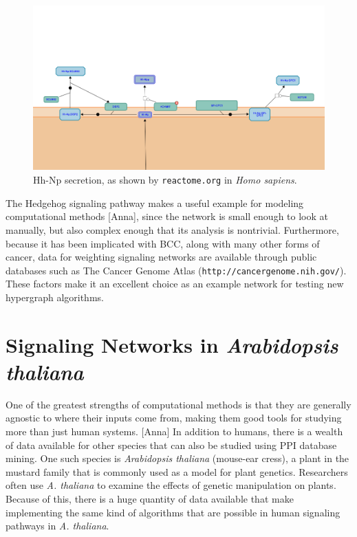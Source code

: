 \documentclass[12pt,twoside]{reedthesis}
\newcommand{\new}[2]{{\color{orange}#1 [#2]}}
\theoremstyle{definition}
\begin{document}
\begin{figure}[h]
  \begin{center}
    \includegraphics[width=\textwidth]{Hh-Np_secretion}
  \caption[Hedgehog secretion in \textit{Homo sapiens}]{Hh-Np secretion, as shown by \texttt{reactome.org} in \textit{Homo sapiens}.}
  \label{fig:Hh-Np_secretion}
  \end{center}
\end{figure}

The Hedgehog signaling pathway makes a useful example for modeling \new{computational methods}{Anna}, since the network is small enough to look at manually, but also complex enough that its analysis is nontrivial. Furthermore, because it has been implicated with BCC, along with many other forms of cancer, data for weighting signaling networks are available through public databases such as The Cancer Genome Atlas (\texttt{http://cancergenome.nih.gov/}). These factors make it an excellent choice as an example network for testing new hypergraph algorithms.\par

\section{Signaling Networks in \emph{Arabidopsis thaliana}}

\new{One of the greatest strengths of computational methods is that they are generally agnostic to where their inputs come from, making them good tools for studying more than just human systems.}{Anna} In addition to humans, there is a wealth of data available for other species that can also be studied using PPI database mining. One such species is \textit{Arabidopsis thaliana} (mouse-ear cress), a plant in the mustard family that is commonly used as a model for plant genetics. Researchers often use \textit{A. thaliana} to examine the effects of genetic manipulation on plants. Because of this, there is a huge quantity of data available that make implementing the same kind of algorithms that are possible in human signaling pathways in \textit{A. thaliana}.
\end{document}

